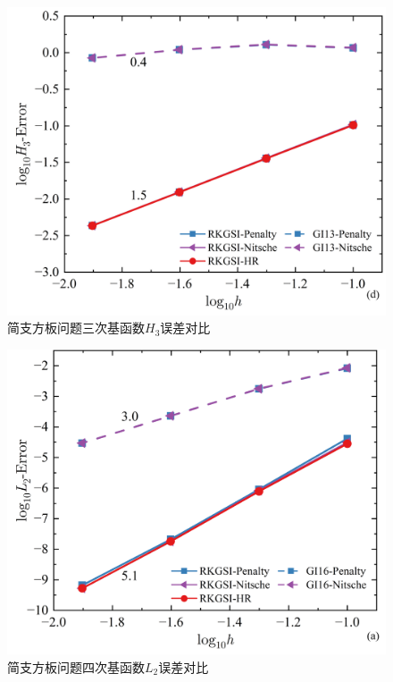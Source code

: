 \begin{figure}[H]
    \centering
    \includegraphics[scale=0.5]{figure/PHR/R/CH3.png}
    \caption{简支方板问题三次基函数$H_3$误差对比}
\end{figure}
\newpage
\begin{figure}[H]
    \centering
    \includegraphics[scale=0.5]{figure/PHR/R/QL2.png}
    \caption{简支方板问题四次基函数$L_2$误差对比}
\end{figure}
